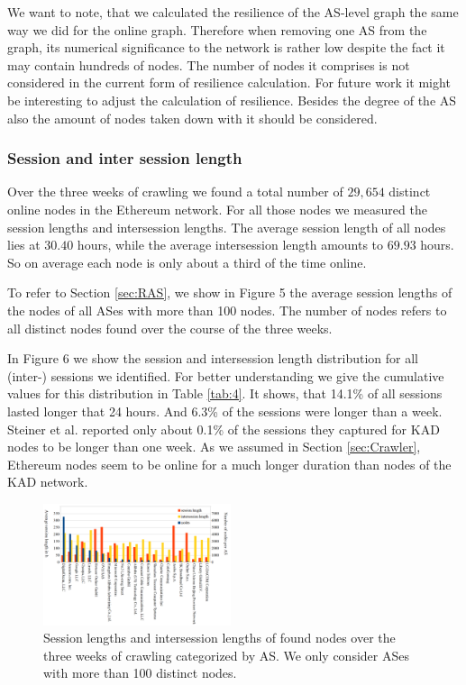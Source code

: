 \documentclass[10pt,conference,final]{IEEEtran}
\begin{document}
We want to note, that we calculated the resilience of the AS-level graph the same way we did for the online graph.
Therefore when removing one AS from the graph, its numerical significance to the network is rather low despite the fact it may contain hundreds of nodes.
The number of nodes it comprises is not considered in the current form of resilience calculation.
For future work it might be interesting to adjust the calculation of resilience.
Besides the degree of the AS also the amount of nodes taken down with it should be considered.

\vspace{1mm}

\subsubsection{Session and inter session length}
\label{sec:RSessions}
Over the three weeks of crawling we found a total number of $29,654$ distinct online nodes in the Ethereum network.
For all those nodes we measured the session lengths and intersession lengths.
The average session length of all nodes lies at $30.40$ hours, while the average intersession length amounts to $69.93$ hours.
So on average each node is only about a third of the time online.

To refer to Section \ref{sec:RAS}, we show in Figure 5 the average session lengths of the nodes of all ASes with more than 100 nodes.
The number of nodes refers to all distinct nodes found over the course of the three weeks.

In Figure 6 we show the session and intersession length distribution for all (inter-) sessions we identified.
For better understanding we give the cumulative values for this distribution in Table \ref{tab:4}.
It shows, that 14.1\% of all sessions lasted longer that 24 hours.
And 6.3\% of the sessions were longer than a week.
Steiner et al. \cite{23} reported only about 0.1\% of the sessions they captured for KAD nodes to be longer than one week.
As we assumed in Section \ref{sec:Crawler}, Ethereum nodes seem to be online for a much longer duration than nodes of the KAD network.

\begin{figure}[!t]
\label{fig:5}
\centering
\includegraphics[width=0.49\textwidth]{./Pictures/sessionsAS.png}
\caption{Session lengths and intersession lengths of found nodes over the three weeks of crawling categorized by AS. We only consider ASes with more than 100 distinct nodes.}
\end{figure}
\end{document}
